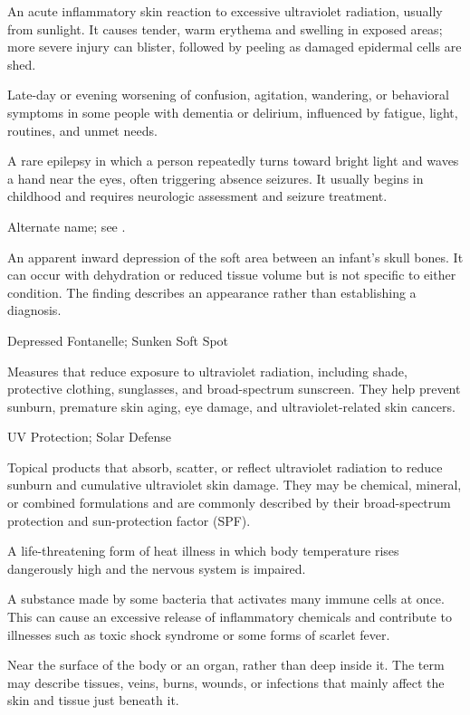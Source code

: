  An acute inflammatory skin reaction to excessive ultraviolet radiation, usually from sunlight. It causes tender, warm erythema and swelling in exposed areas; more severe injury can blister, followed by peeling as damaged epidermal cells are shed.

 Late-day or evening worsening of confusion, agitation, wandering, or behavioral symptoms in some people with dementia or delirium, influenced by fatigue, light, routines, and unmet needs.

 A rare epilepsy in which a person repeatedly turns toward bright light and waves a hand near the eyes, often triggering absence seizures. It usually begins in childhood and requires neurologic assessment and seizure treatment.

 Alternate name; see .

 An apparent inward depression of the soft area between an infant's skull bones.
It can occur with dehydration or reduced tissue volume but is not specific to either condition.
The finding describes an appearance rather than establishing a diagnosis.

\synonyms
Depressed Fontanelle; Sunken Soft Spot

 Measures that reduce exposure to ultraviolet radiation, including shade, protective clothing, sunglasses, and broad-spectrum sunscreen. They help prevent sunburn, premature skin aging, eye damage, and ultraviolet-related skin cancers.

\synonyms
UV Protection; Solar Defense

 Topical products that absorb, scatter, or reflect ultraviolet radiation to reduce sunburn and cumulative ultraviolet skin damage. They may be chemical, mineral, or combined formulations and are commonly described by their broad-spectrum protection and sun-protection factor (SPF).

 A life-threatening form of heat illness in which body temperature rises dangerously high and the nervous system is impaired.

 A substance made by some bacteria that activates many immune cells at once. This can cause an excessive release of inflammatory chemicals and contribute to illnesses such as toxic shock syndrome or some forms of scarlet fever.

 Near the surface of the body or an organ, rather than deep inside it. The term may describe tissues, veins, burns, wounds, or infections that mainly affect the skin and tissue just beneath it.


